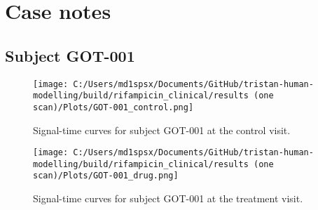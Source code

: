 \documentclass{epflreport}%
\begin{document}
\section{Case notes}%
\label{sec:Casenotes}%

%
\subsection{Subject GOT{-}001}%
\label{subsec:SubjectGOT{-}001}%

%


\begin{figure}[h!]%
\centering%
\texttt{[image: C:/Users/md1spsx/Documents/GitHub/tristan-human-modelling/build/rifampicin\_clinical/results (one scan)/Plots/GOT-001\_control.png]}%
\caption{Signal{-}time curves for subject GOT{-}001 at the control visit.}%
\end{figure}

%


\begin{figure}[h!]%
\centering%
\texttt{[image: C:/Users/md1spsx/Documents/GitHub/tristan-human-modelling/build/rifampicin\_clinical/results (one scan)/Plots/GOT-001\_drug.png]}%
\caption{Signal{-}time curves for subject GOT{-}001 at the treatment visit.}%
\end{figure}
\end{document}
